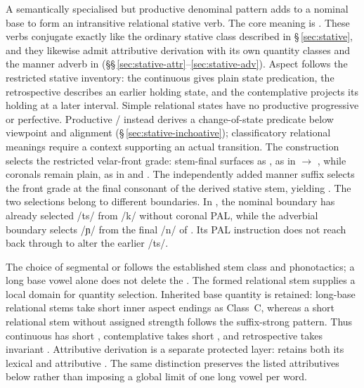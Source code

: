 A semantically specialised but productive denominal pattern adds
 to a nominal base to form an intransitive relational stative
verb. The core meaning is . These verbs
conjugate exactly like the ordinary stative class described in
§\,\ref{sec:stative}, and they likewise admit attributive derivation with
its own quantity classes and the manner adverb in 
(§§\,\ref{sec:stative-attr}--\ref{sec:stative-adv}). Aspect follows the
restricted stative inventory: the continuous gives plain state predication,
the retrospective describes an earlier holding state, and the contemplative
projects its holding at a later interval. Simple relational states have no
productive progressive or perfective. Productive
/ instead derives a change-of-state predicate below
viewpoint and alignment (§\,\ref{sec:stative-inchoative}); classificatory
relational meanings require a context supporting an actual transition. The construction selects the restricted
velar-front grade: stem-final  surfaces as , as in
 $\rightarrow$ , while coronals remain plain,
as in  and . The independently added manner
suffix  selects the front grade at the final consonant of the
derived stative stem, yielding . The two selections belong to
different boundaries. In , the nominal boundary has already
selected /ts/ from /k/ without coronal PAL, while the adverbial boundary
selects /ɲ/ from the final /n/ of . Its PAL instruction
does not reach back through  to alter the earlier /ts/.

The choice of segmental  or  follows the established
stem class and phonotactics; a long base vowel alone does not delete the
. The formed relational stem supplies a local domain for quantity
selection. Inherited base quantity is retained: long-base relational stems
take short inner aspect endings as Class~C, whereas a short relational stem
without assigned strength follows the suffix-strong pattern. Thus
continuous  has short , contemplative takes short
, and retrospective takes invariant . Attributive derivation
is a separate protected layer:  retains both its lexical
 and attributive . The same distinction preserves the
listed attributives below rather than imposing a global limit of one long
vowel per word.

